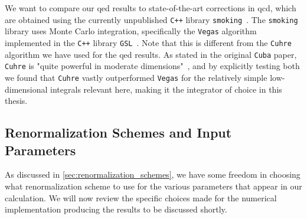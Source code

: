 We want to compare our \gls{qed} results to state-of-the-art corrections in \gls{qcd}, which are obtained using the currently unpublished \texttt{C++} library \texttt{smoking}~\cite{smoking}.
The \texttt{smoking} library uses Monte Carlo integration, specifically the \texttt{Vegas} algorithm~\cite{Lepage:1977sw} implemented in the \texttt{C++} library \texttt{GSL}~\cite{Galassi:2019czg}.
Note that this is different from the \texttt{Cuhre} algorithm we have used for the \gls{qed} results.
As stated in the original \texttt{Cuba} paper, \texttt{Cuhre} is "quite powerful in moderate dimensions"~\cite{Hahn:2004fe}, and by explicitly testing both we found that \texttt{Cuhre} vastly outperformed \texttt{Vegas} for the relatively simple low-dimensional integrals relevant here, making it the integrator of choice in this thesis.


\subsection{Renormalization Schemes and Input Parameters}
As discussed in \cref{sec:renormalization_schemes}, we have some freedom in choosing what renormalization scheme to use for the various parameters that appear in our calculation.
We will now review the specific choices made for the numerical implementation producing the results to be discussed shortly.


